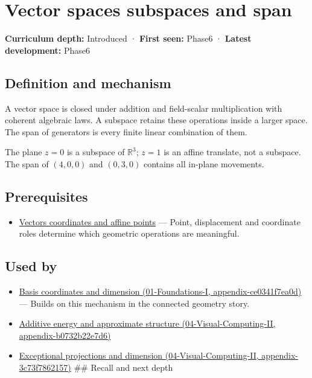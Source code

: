 \hypertarget{appendix-173b52c063ae}{}
\section{Vector spaces subspaces and span}\label{appendix-173b52c063ae-vector-spaces-subspaces-and-span}

\textbf{Curriculum depth:} Introduced · \textbf{First seen:} Phase6 · \textbf{Latest development:} Phase6

\subsection{Definition and mechanism}\label{appendix-173b52c063ae-definition-and-mechanism}

A vector space is closed under addition and field-scalar multiplication with coherent algebraic laws. A subspace retains these operations inside a larger space. The span of generators is every finite linear combination of them.

The plane \(z=0\) is a subspace of \(\mathbb R^3\); \(z=1\) is an affine translate, not a subspace. The span of \((4,0,0)\) and \((0,3,0)\) contains all in-plane movements.

\subsection{Prerequisites}\label{appendix-173b52c063ae-prerequisites}

\begin{itemize}
\tightlist
\item
  \hyperref[appendix-0659864c0aa3]{Vectors coordinates and affine points} --- Point, displacement and coordinate roles determine which geometric operations are meaningful.
\end{itemize}

\subsection{Used by}\label{appendix-173b52c063ae-used-by}

\begin{itemize}
\item
  \href{../01-Foundations-I/main.pdf\#nameddest=appendix-ce0341f7ea0d}{Basis coordinates and dimension (01-Foundations-I, appendix-ce0341f7ea0d)} --- Builds on this mechanism in the connected geometry story.
\item
  \href{../04-Visual-Computing-II/main.pdf\#nameddest=appendix-b0732b22e7d6}{Additive energy and approximate structure (04-Visual-Computing-II, appendix-b0732b22e7d6)}
\item
  \href{../04-Visual-Computing-II/main.pdf\#nameddest=appendix-3c73f7862157}{Exceptional projections and dimension (04-Visual-Computing-II, appendix-3c73f7862157)} \#\# Recall and next depth
\end{itemize}

